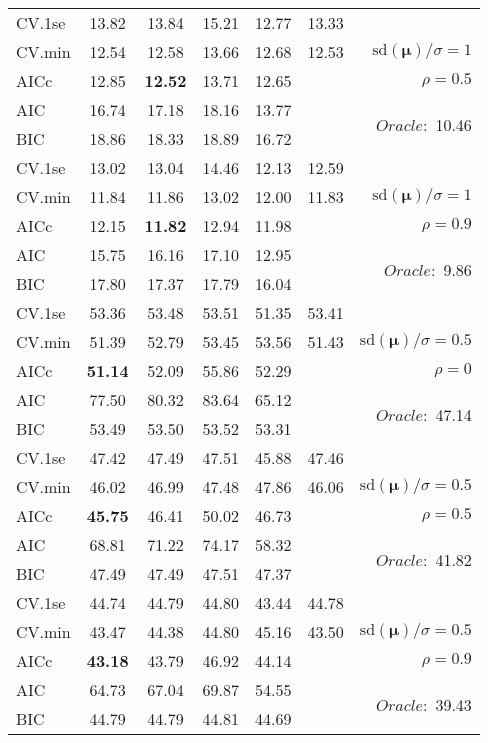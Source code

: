 \begin{table}
\begin{center}
\begin{tabular}{l*{5}{c}|r}
 \hline 
CV.1se & 13.82 & 13.84 & 15.21 & 12.77 & 13.33 & \\
CV.min & 12.54 & 12.58 & 13.66 & 12.68 & 12.53 &  $\mathrm{sd}(\mathbf{\mu})/\sigma=1$ \\
AICc & 12.85 & {\bf 12.52} & 13.71 & 12.65 & & $\rho=0.5$ \\
AIC & 16.74 & 17.18 & 18.16 & 13.77 & &  \multirow{2}{*}{$Oracle: $ 10.46} \\
BIC & 18.86 & 18.33 & 18.89 & 16.72 & &  \\
 \hline 
CV.1se & 13.02 & 13.04 & 14.46 & 12.13 & 12.59 & \\
CV.min & 11.84 & 11.86 & 13.02 & 12.00 & 11.83 &  $\mathrm{sd}(\mathbf{\mu})/\sigma=1$ \\
AICc & 12.15 & {\bf 11.82} & 12.94 & 11.98 & & $\rho=0.9$ \\
AIC & 15.75 & 16.16 & 17.10 & 12.95 & &  \multirow{2}{*}{$Oracle: $ 9.86} \\
BIC & 17.80 & 17.37 & 17.79 & 16.04 & &  \\
 \hline 
CV.1se & 53.36 & 53.48 & 53.51 & 51.35 & 53.41 & \\
CV.min & 51.39 & 52.79 & 53.45 & 53.56 & 51.43 &  $\mathrm{sd}(\mathbf{\mu})/\sigma=0.5$ \\
AICc & {\bf 51.14} & 52.09 & 55.86 & 52.29 & & $\rho=0$ \\
AIC & 77.50 & 80.32 & 83.64 & 65.12 & &  \multirow{2}{*}{$Oracle: $ 47.14} \\
BIC & 53.49 & 53.50 & 53.52 & 53.31 & &  \\
 \hline 
CV.1se & 47.42 & 47.49 & 47.51 & 45.88 & 47.46 & \\
CV.min & 46.02 & 46.99 & 47.48 & 47.86 & 46.06 &  $\mathrm{sd}(\mathbf{\mu})/\sigma=0.5$ \\
AICc & {\bf 45.75} & 46.41 & 50.02 & 46.73 & & $\rho=0.5$ \\
AIC & 68.81 & 71.22 & 74.17 & 58.32 & &  \multirow{2}{*}{$Oracle: $ 41.82} \\
BIC & 47.49 & 47.49 & 47.51 & 47.37 & &  \\
 \hline 
CV.1se & 44.74 & 44.79 & 44.80 & 43.44 & 44.78 & \\
CV.min & 43.47 & 44.38 & 44.80 & 45.16 & 43.50 &  $\mathrm{sd}(\mathbf{\mu})/\sigma=0.5$ \\
AICc & {\bf 43.18} & 43.79 & 46.92 & 44.14 & & $\rho=0.9$ \\
AIC & 64.73 & 67.04 & 69.87 & 54.55 & &  \multirow{2}{*}{$Oracle: $ 39.43} \\
BIC & 44.79 & 44.79 & 44.81 & 44.69 & &  \\
 \hline 
\end{tabular}
\end{center}
\vspace{-1cm}
\end{table}




